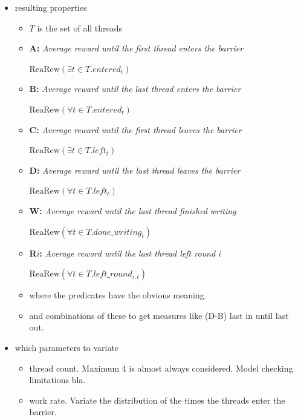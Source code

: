 \documentclass[a4paper, 10pt]{article}
\begin{document}
\begin{itemize}
	\item resulting properties
		\begin{itemize}
			\item $T$ is the set of all threads
			\item \textbf{A:} \emph{Average reward until the first thread enters the barrier}
				\begin{center}
					$\mathrm{ReaRew}(\exists t \in T . \mathit{entered_t} )$
				\end{center}
			\item \textbf{B:} \emph{Average reward until the last thread enters the barrier}
				\begin{center}
					$\mathrm{ReaRew}(\forall t \in T . \mathit{entered_t} )$
				\end{center}
			\item \textbf{C:} \emph{Average reward until the first thread leaves the barrier}
				\begin{center}
					$\mathrm{ReaRew}(\exists t \in T . \mathit{left_t} )$
				\end{center}
			\item \textbf{D:} \emph{Average reward until the last thread leaves the barrier}
				\begin{center}
					$\mathrm{ReaRew}(\forall t \in T . \mathit{left_t} )$
				\end{center}
			\item \textbf{W:} \emph{Average reward until the last thread finished writing}
				\begin{center}
					$\mathrm{ReaRew}(\forall t \in T . \mathit{done\_writing_t} )$
				\end{center}
			\item \textbf{R$i$:} \emph{Average reward until the last thread left round $i$}
				\begin{center}
					$\mathrm{ReaRew}(\forall t \in T . \mathit{left\_round_{i,t}} )$
				\end{center}
			\item where the predicates have the obvious meaning.
			\item and combinations of these to get measures like (D-B) last in until last out.
		\end{itemize}
	\item which parameters to variate
		\begin{itemize}
			\item thread count. Maximum 4 is almost always considered. Model checking limitations bla.
			\item work rate. Variate the distribution of the times the threads enter the barrier.
		\end{itemize}
\end{itemize}
\end{document}
